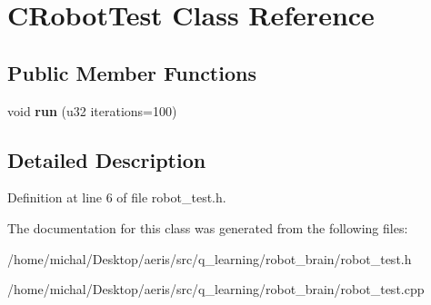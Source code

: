 \hypertarget{classCRobotTest}{\section{C\-Robot\-Test Class Reference}
\label{classCRobotTest}
}
\subsection*{Public Member Functions}
\begin{DoxyCompactItemize}
\item 
\hypertarget{classCRobotTest_a4fb50d81a83d6c553dd23b85e16c37d2}{void {\bfseries run} (u32 iterations=100)}\label{classCRobotTest_a4fb50d81a83d6c553dd23b85e16c37d2}

\end{DoxyCompactItemize}


\subsection{Detailed Description}


Definition at line 6 of file robot\-\_\-test.\-h.



The documentation for this class was generated from the following files\-:\begin{DoxyCompactItemize}
\item 
/home/michal/\-Desktop/aeris/src/q\-\_\-learning/robot\-\_\-brain/robot\-\_\-test.\-h\item 
/home/michal/\-Desktop/aeris/src/q\-\_\-learning/robot\-\_\-brain/robot\-\_\-test.\-cpp\end{DoxyCompactItemize}
